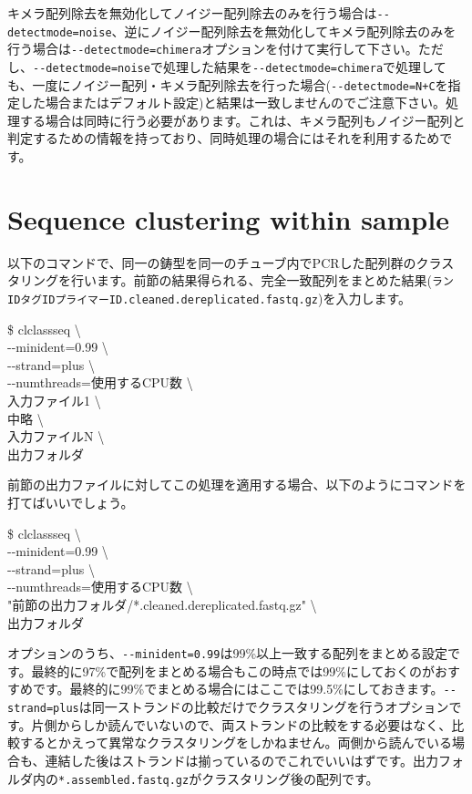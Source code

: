 \documentclass[titlepage,10pt,a4paper,english]{jsbook}
\newenvironment{cmd}{\begin{oframed}\raggedright\ttfamily\footnotesize\setlength{\baselineskip}{1.4em}}{\end{oframed}\vspace{-1em}}
\begin{document}
キメラ配列除去を無効化してノイジー配列除去のみを行う場合は\texttt{{-}{-}detectmode=noise}、逆にノイジー配列除去を無効化してキメラ配列除去のみを行う場合は\texttt{{-}{-}detectmode=chimera}オプションを付けて実行して下さい。ただし、\texttt{{-}{-}detectmode=noise}で処理した結果を\texttt{{-}{-}detectmode=chimera}で処理しても、一度にノイジー配列・キメラ配列除去を行った場合(\texttt{{-}{-}detectmode=N+C}を指定した場合またはデフォルト設定)と結果は一致しませんのでご注意下さい。処理する場合は同時に行う必要があります。これは、キメラ配列もノイジー配列と判定するための情報を持っており、同時処理の場合にはそれを利用するためです。

\section{Sequence clustering within sample}

以下のコマンドで、同一の鋳型を同一のチューブ内でPCRした配列群のクラスタリングを行います。前節の結果得られる、完全一致配列をまとめた結果(\texttt{ランID{\textunderscore}{\textunderscore}タグID{\textunderscore}{\textunderscore}プライマーID.cleaned.dereplicated.fastq.gz})を入力します。
\begin{cmd}
\$ clclassseq {\textbackslash}\\
{-}{-}minident=0.99 {\textbackslash}\\
{-}{-}strand=plus {\textbackslash}\\
{-}{-}numthreads=使用するCPU数 {\textbackslash}\\
入力ファイル1 {\textbackslash}\\
中略 {\textbackslash}\\
入力ファイルN {\textbackslash}\\
出力フォルダ
\end{cmd}
前節の出力ファイルに対してこの処理を適用する場合、以下のようにコマンドを打てばいいでしょう。
\begin{cmd}
\$ clclassseq {\textbackslash}\\
{-}{-}minident=0.99 {\textbackslash}\\
{-}{-}strand=plus {\textbackslash}\\
{-}{-}numthreads=使用するCPU数 {\textbackslash}\\
"前節の出力フォルダ/*.cleaned.dereplicated.fastq.gz" {\textbackslash}\\
出力フォルダ
\end{cmd}
オプションのうち、\texttt{{-}{-}minident=0.99}は99\%以上一致する配列をまとめる設定です。最終的に97\%で配列をまとめる場合もこの時点では99\%にしておくのがおすすめです。最終的に99\%でまとめる場合にはここでは99.5\%にしておきます。\texttt{{-}{-}strand=plus}は同一ストランドの比較だけでクラスタリングを行うオプションです。片側からしか読んでいないので、両ストランドの比較をする必要はなく、比較するとかえって異常なクラスタリングをしかねません。両側から読んでいる場合も、連結した後はストランドは揃っているのでこれでいいはずです。出力フォルダ内の\texttt{*.assembled.fastq.gz}がクラスタリング後の配列です。
\end{document}
